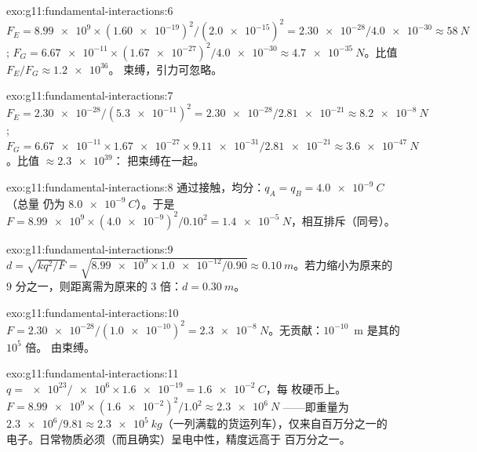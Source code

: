 \begin{solution}{exo:g11:fundamental-interactions:6}
$F_E = \num{8.99e9} \times (\num{1.60e-19})^2/(\num{2.0e-15})^2
= \num{2.30e-28}/\num{4.0e-30} \approx \qty{58}{N}$;
$F_G = \num{6.67e-11} \times (\num{1.67e-27})^2/\num{4.0e-30}
\approx \qty{4.7e-35}{N}$。比值 $F_E/F_G \approx \num{1.2e36}$。
束缚，引力可忽略。
\end{solution}

\begin{solution}{exo:g11:fundamental-interactions:7}
$F_E = \num{2.30e-28}/(\num{5.3e-11})^2 = \num{2.30e-28}/\num{2.81e-21}
\approx \qty{8.2e-8}{N}$;
$F_G = \num{6.67e-11} \times \num{1.67e-27} \times \num{9.11e-31} /
\num{2.81e-21} \approx \qty{3.6e-47}{N}$。比值 $\approx \num{2.3e39}$：
把束缚在一起。
\end{solution}

\begin{solution}{exo:g11:fundamental-interactions:8}
通过接触，均分：$q_A = q_B = \qty{+4.0e-9}{C}$（总量
仍为 $\qty{8.0e-9}{C}$）。于是
$F = \num{8.99e9} \times (\num{4.0e-9})^2/0.10^2 =
\qty{1.4e-5}{N}$，相互排斥（同号）。
\end{solution}

\begin{solution}{exo:g11:fundamental-interactions:9}
$d = \sqrt{k q^2/F} = \sqrt{\num{8.99e9} \times \num{1.0e-12}/0.90}
\approx \qty{0.10}{m}$。若力缩小为原来的 $9$ 分之一，则距离需为原来的 $3$
倍：$d = \qty{0.30}{m}$。
\end{solution}

\begin{solution}{exo:g11:fundamental-interactions:10}
$F = \num{2.30e-28}/(\num{1.0e-10})^2 = \qty{2.3e-8}{N}$。无贡献：$10^{-10}$~m 是其的 $10^{5}$ 倍。
由束缚。
\end{solution}

\begin{solution}{exo:g11:fundamental-interactions:11}
$q = \num{e23}/\num{e6} \times \num{1.6e-19} = \qty{1.6e-2}{C}$，每
枚硬币上。$F = \num{8.99e9} \times (\num{1.6e-2})^2/1.0^2 \approx
\qty{2.3e6}{N}$ ——即重量为 $\num{2.3e6}/9.81 \approx
\qty{2.3e5}{kg}$（一列满载的货运列车），仅来自百万分之一的
电子。日常物质必须（而且确实）呈电中性，精度远高于
百万分之一。
\end{solution}

